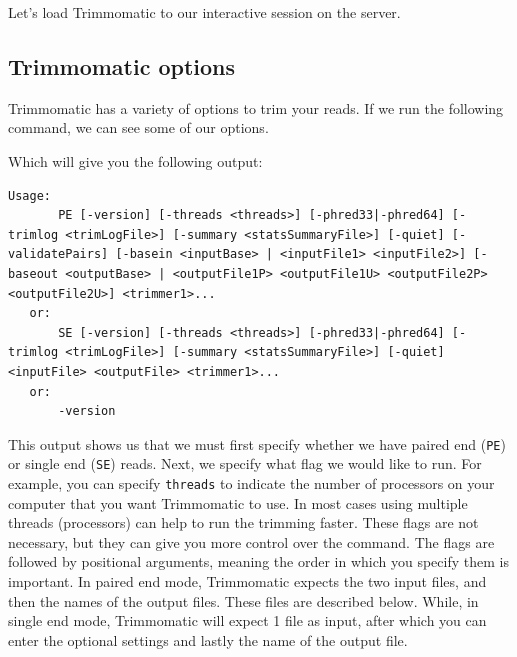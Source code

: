 \documentclass[
  letterpaper,
  DIV=11,
  numbers=noendperiod]{scrreprt}
\newenvironment{Shaded}{\begin{snugshade}}{\end{snugshade}}
\newcommand{\ExtensionTok}[1]{\textcolor[rgb]{0.00,0.23,0.31}{#1}}
\newcommand{\NormalTok}[1]{\textcolor[rgb]{0.00,0.23,0.31}{#1}}
\begin{document}
Let's load Trimmomatic to our interactive session on the server.

\begin{Shaded}
\end{Shaded}

\hypertarget{trimmomatic-options}{%
\subsection{Trimmomatic options}\label{trimmomatic-options}}

Trimmomatic has a variety of options to trim your reads. If we run the
following command, we can see some of our options.

\begin{Shaded}
\end{Shaded}

Which will give you the following output:

\begin{verbatim}
Usage: 
       PE [-version] [-threads <threads>] [-phred33|-phred64] [-trimlog <trimLogFile>] [-summary <statsSummaryFile>] [-quiet] [-validatePairs] [-basein <inputBase> | <inputFile1> <inputFile2>] [-baseout <outputBase> | <outputFile1P> <outputFile1U> <outputFile2P> <outputFile2U>] <trimmer1>...
   or: 
       SE [-version] [-threads <threads>] [-phred33|-phred64] [-trimlog <trimLogFile>] [-summary <statsSummaryFile>] [-quiet] <inputFile> <outputFile> <trimmer1>...
   or: 
       -version
\end{verbatim}

This output shows us that we must first specify whether we have paired
end (\texttt{PE}) or single end (\texttt{SE}) reads. Next, we specify
what flag we would like to run. For example, you can specify
\texttt{threads} to indicate the number of processors on your computer
that you want Trimmomatic to use. In most cases using multiple threads
(processors) can help to run the trimming faster. These flags are not
necessary, but they can give you more control over the command. The
flags are followed by positional arguments, meaning the order in which
you specify them is important. In paired end mode, Trimmomatic expects
the two input files, and then the names of the output files. These files
are described below. While, in single end mode, Trimmomatic will expect
1 file as input, after which you can enter the optional settings and
lastly the name of the output file.
\end{document}
